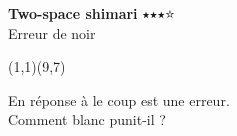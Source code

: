 \documentclass[preview, border=0pt, varwidth=false]{standalone}
\begin{document}
	\setgounit{0.6cm} 
	
\parbox[c][14.65cm][c]{10.2cm}{
	\centering
	
	{\Large\textbf{Two-space shimari} $\medblackstar \medblackstar \medblackstar \medwhitestar$ \\ Erreur de noir}
	\vspace{3em}
	
	\begin{psgopartialboard}{(1,1)(9,7)}
		\pass
	\end{psgopartialboard}
	
	\vspace{1em}
	En réponse à  le coup  est une erreur. \\ Comment blanc punit-il ?
}
\end{document}
